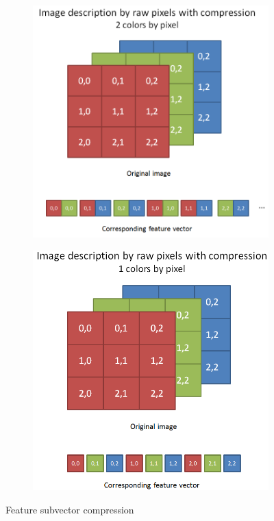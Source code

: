 \documentclass[a4paper]{report}
\begin{document}
		\begin{figure}
		\begin{subfigure}{.5\textwidth}
			\centering
			\includegraphics[width=1.\linewidth]{images/imgDesc2col.png}
			\caption{\label{fig:imgDesc2col}}
		\end{subfigure}%
		\begin{subfigure}{.5\textwidth}
			\centering
			\includegraphics[width=1.\linewidth]{images/imgDesc1Col.png}
			\caption{\label{fig:imgDesc1Col}}
		\end{subfigure}
		\caption{\label{fig:imgDescCompression}Feature subvector compression}
	\end{figure}
		
\end{document}
